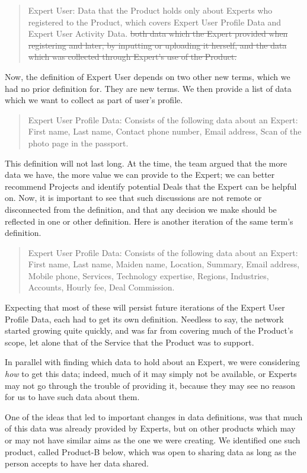 \documentclass[graybox,envcountchap,sectrefs]{svmono}
\newcommand{\newterm}[1]{\begin{quote}\textsf{#1}\end{quote}}
\newcommand{\nterm}[1]{\textsf{#1}}
\begin{document}
\newterm{Expert User: Data that the Product holds only about Experts who registered to the Product, which covers Expert User Profile Data and Expert User Activity Data. \sout{both data which the Expert provided when registering and later, by inputting or uploading it herself, and the data which was collected through Expert's use of the Product.}}

Now, the definition of \nterm{Expert User} depends on two other new terms, which we had no prior definition for. They are new terms. We then provide a list of data which we want to collect as part of user's profile. 

\newterm{Expert User Profile Data: Consists of the following data about an Expert: First name, Last name, Contact phone number, Email address, Scan of the photo page in the passport.
}

This definition will not last long. At the time, the team argued that the more data we have, the more value we can provide to the \nterm{Expert}; we can better recommend \nterm{Projects} and identify potential \nterm{Deals} that the \nterm{Expert} can be helpful on. Now, it is important to see that such discussions are not remote or disconnected from the definition, and that any decision we make should be reflected in one or other definition. Here is another iteration of the same term's definition.

\newterm{Expert User Profile Data: Consists of the following data about an Expert: First name, Last name, Maiden name, Location, Summary, Email address, Mobile phone, Services, Technology expertise, Regions, Industries, Accounts, Hourly fee, Deal Commission.}

Expecting that most of these will persist future iterations of the \nterm{Expert User Profile Data}, each had to get its own definition. Needless to say, the network started growing quite quickly, and was far from covering much of the \nterm{Product}'s scope, let alone that of the \nterm{Service} that the \nterm{Product} was to support.

In parallel with finding which data to hold about an \nterm{Expert}, we were considering \textit{how} to get this data; indeed, much of it may simply not be available, or \nterm{Experts} may not go through the trouble of providing it, because they may see no reason for us to have such data about them.

One of the ideas that led to important changes in data definitions, was that much of this data was already provided by \nterm{Experts}, but on other products which may or may not have similar aims as the one we were creating. We identified one such product, called Product-B below, which was open to sharing data as long as the person accepts to have her data shared. 
\end{document}
